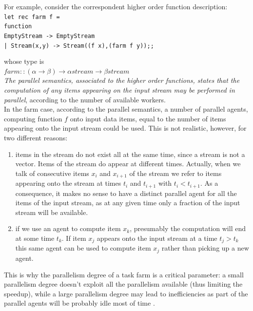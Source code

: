For example, consider the correspondent higher order function description:\\
\texttt{let rec farm f =\\
	function\\
	EmptyStream -> EmptyStream\\
	| Stream(x,y) -> Stream((f x),(farm f y));;\\
	}
	
whose type is\\
\( farm :: (\alpha \rightarrow \beta) \rightarrow \alpha stream \rightarrow \beta stream \)\\




\textit{The parallel semantics, associated to the higher order functions, states that the computation of any items appearing on the input stream may be performed in parallel}, according to the number of available workers.\\

In the farm case, according to the parallel semantics, a number of parallel agents, computing function \(f\) onto input data items, equal to the number of items appearing onto the input stream could be used. This is not realistic, however, for two different reasons:

\begin{enumerate}
	\item items in the stream do not exist all at the same time, since a stream is not a vector.
	Items of the stream do appear at different times. Actually, when we talk of consecutive items \(x_{i}\) and \(x_{i+1}\) of the stream we refer to items appearing onto the stream at times \(t_{i}\) and \(t_{i+1}\) with \(t_{i} < t_{i+1}\). As a consequence, it makes no sense to have a distinct parallel agent for all the items of the input stream, as at any given time only a fraction of the input stream will be available.
	
	\item if we use an agent to compute item \(x_{k}\), presumably the computation will end at some
	time \(t_{k}\). If item \(x_{j}\) appears onto the input stream at a time \(t_{j} > t_{k}\) this same agent
	can be used to compute item \(x_{j}\) rather than picking up a new agent. \\
\end{enumerate}
This is why the parallelism degree of a task farm is a critical parameter: a small parallelism degree doesn't exploit all the parallelism available (thus limiting the speedup), while a large parallelism degree may lead to inefficiencies as part of the parallel agents will be probably idle most of time \cite{spm}.\\


